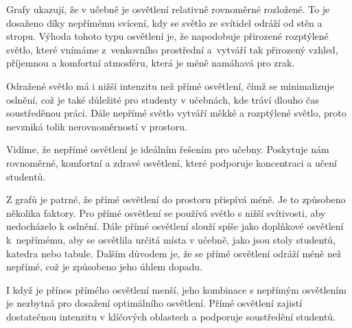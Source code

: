 \medskip {}


Grafy ukazují, že v učebně je osvětlení relativně rovnoměrné rozložené.
To je dosaženo díky nepřímému svícení, kdy se světlo ze svítidel odráží od stěn a stropu.
Výhoda tohoto typu osvětlení je, že napodobuje přirozené rozptýlené světlo, které vnímáme z~venkovního prostřední
a~vytváří tak přirozený vzhled, příjemnou a komfortní atmosféru, která je méně namáhavá pro zrak.

Odražené světlo má i nižší intenzitu než přímé osvětlení, čímž se minimalizuje oslnění, což je také důležité pro
studenty v učebnách, kde tráví dlouho čas soustředěnou práci.
Dále nepřímé světlo vytváří měkké a rozptýlené světlo, proto nevzniká tolik nerovnoměrností v prostoru.

Vidíme, že nepřímé osvětlení je ideálním řešením pro učebny. Poskytuje nám rovnoměrné,
komfortní a zdravé osvětlení, které podporuje koncentraci a učení studentů.

\medskip {}

Z grafů je patrné, že přímé osvětlení do prostoru přispívá méně. Je to způsobeno několika faktory.
Pro přímé osvětlení se používá světlo s nižší svítivosti, aby nedocházelo k oslnění.
Dále přímé osvětlení slouží spíše jako doplňkové osvětlení k~nepřímému, aby se osvětlila určitá místa v učebně,
jako jsou stoly studentů, katedra nebo tabule. Dalším důvodem je, že se přímé osvětlení odráží
méně než nepřímé, což je způsobeno jeho úhlem dopadu.

I když je přínos přímého osvětlení menší, jeho kombinace s nepřímým osvětlením je nezbytná pro dosažení
optimálního osvětlení. Přímé osvětlení zajistí dostatečnou intenzitu v klíčových oblastech a podporuje soustředění studentů.




